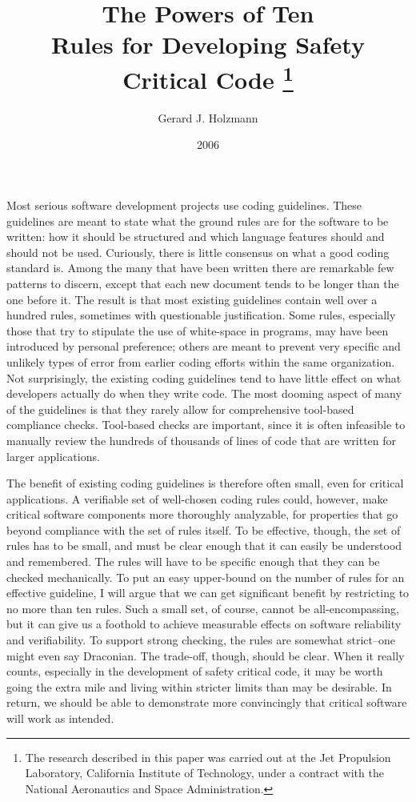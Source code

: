 \documentclass[11pt,oneside]{article}
\title{The Powers of Ten \\
Rules for Developing Safety Critical Code \footnote{%
The research described in this paper was carried out at the Jet Propulsion
Laboratory, California Institute of Technology, under a contract with the
National Aeronautics and Space Administration.}}
\author{Gerard J. Holzmann}
\date{2006}
\begin{document}
\maketitle
\tableofcontents
\setcounter{secnumdepth}{0}
\newpage
Most serious software development projects use coding guidelines. These
guidelines are meant to state what the ground rules are for the software to be
written: how it should be structured and which language features should and
should not be used. Curiously, there is little consensus on what a good coding
standard is. Among the many that have been written there are remarkable few
patterns to discern, except that each new document tends to be longer than
the one before it. The result is that most existing guidelines contain well
over a hundred rules, sometimes with questionable justification. Some rules,
especially those that try to stipulate the use of white-space in programs, may
have been introduced by personal preference; others are meant to prevent very
specific and unlikely types of error from earlier coding efforts within the
same organization. Not surprisingly, the existing coding guidelines tend to
have little effect on what developers actually do when they write code. The
most dooming aspect of many of the guidelines is that they rarely allow for
comprehensive tool-based compliance checks. Tool-based checks are important,
since it is often infeasible to manually review the hundreds of thousands of
lines of code that are written for larger applications.

The benefit of existing coding guidelines is therefore often small, even for
critical applications. A verifiable set of well-chosen coding rules could,
however, make critical software components more thoroughly analyzable, for
properties that go beyond compliance with the set of rules itself. To be
effective, though, the set of rules has to be small, and must be clear enough
that it can easily be understood and remembered. The rules will have to be
specific enough that they can be checked mechanically. To put an easy
upper-bound on the number of rules for an effective guideline, I will argue
that we can get significant benefit by restricting to no more than ten rules.
Such a small set, of course, cannot be all-encompassing, but it can give us a
foothold to achieve measurable effects on software reliability and
verifiability. To support strong checking, the rules are somewhat strict--one
might even say Draconian. The trade-off, though, should be clear. When it
really counts, especially in the development of safety critical code, it may be
worth going the extra mile and living within stricter limits than may be
desirable. In return, we should be able to demonstrate more convincingly that
critical software will work as intended.
\end{document}

